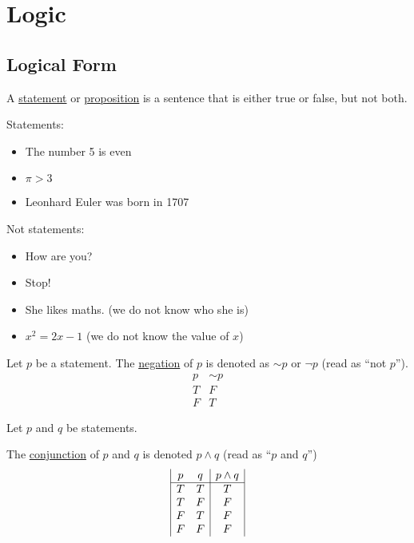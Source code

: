 \section{Logic}
\subsection{Logical Form}
\begin{definition}A \underline{statement} or \underline{proposition} is a sentence that is either true or false, but not both.\end{definition}

\begin{example}
Statements: \begin{itemize}
    \item The number 5 is even
    \item $\pi > 3$
    \item Leonhard Euler was born in 1707
\end{itemize}

Not statements: \begin{itemize}
    \item How are you?
    \item Stop!
    \item She likes maths. (we do not know who she is)
    \item $x^2 = 2x - 1$ (we do not know the value of $x$)
\end{itemize}
\end{example}

\begin{definition}Let $p$ be a statement. The \underline{negation} of $p$ is denoted as $\sim p$ or $\neg p$ (read as ``not $p$'').$$\begin{array}{|c|c|}
p & \sim p \\
\hline
T & F \\
F & T
\end{array}$$
\end{definition}


Let $p$ and $q$ be statements.

\begin{definition}The \underline{conjunction} of $p$ and $q$ is denoted $p \land q$ (read as ``$p$ and $q$'')$$\begin{array}{|c c|c|}
p & q & p\land q \\
\hline
T & T & T \\
T & F & F \\
F & T & F \\
F & F & F
\end{array}$$\end{definition}


